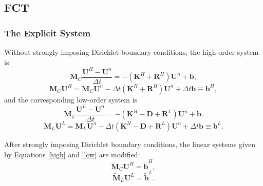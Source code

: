 \subsection{FCT}
\subsubsection{The Explicit System}
Without strongly imposing Dirichlet boundary conditions, the high-order system is
\begin{equation}
   \mathbf{M}_C\frac{\mathbf{U}^H-\mathbf{U}^n}{\Delta t}
      = -(\mathbf{K}^H+\mathbf{R}^H)\mathbf{U}^n + \mathbf{b},
\end{equation}
\begin{equation}\label{high}
   \mathbf{M}_C\mathbf{U}^H = \mathbf{M}_C\mathbf{U}^n
      - \Delta t(\mathbf{K}^H+\mathbf{R}^H)\mathbf{U}^n + \Delta t\mathbf{b} \equiv \mathbf{b}^H,
\end{equation}
and the corresponding low-order system is
\begin{equation}
   \mathbf{M}_L\frac{\mathbf{U}^L-\mathbf{U}^n}{\Delta t}
      = -(\mathbf{K}^H - \mathbf{D} + \mathbf{R}^L)\mathbf{U}^n + \mathbf{b}.
\end{equation}
\begin{equation}\label{low}
   \mathbf{M}_L\mathbf{U}^L = \mathbf{M}_L\mathbf{U}^n
      - \Delta t(\mathbf{K}^H - \mathbf{D} + \mathbf{R}^L)\mathbf{U}^n + \Delta t\mathbf{b}
      \equiv \mathbf{b}^L.
\end{equation}

After strongly imposing Dirichlet boundary conditions, the linear
systems given by Equations \ref{high} and \ref{low} are modified:
\begin{equation}\label{highD}
   \tilde{\mathbf{M}}_C\mathbf{U}^H = \tilde{\mathbf{b}}^H,
\end{equation}
\begin{equation}\label{lowD}
   \tilde{\mathbf{M}}_L\mathbf{U}^L = \tilde{\mathbf{b}}^L.
\end{equation}
